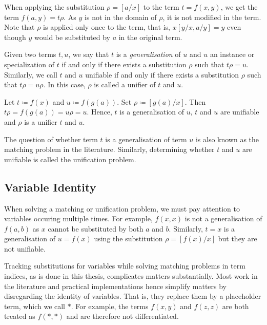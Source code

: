 When applying the substitution $\rho = [a/x]$ to the term $t = f(x,y)$, we get the term $f(a,y) = t \rho$. As $y$ is not in the domain of $\rho$, it is not modified in the term. Note that $\rho$ is applied only once to the term, that is, $x [y/x, a/y] = y$ even though $y$ would be substituted by $a$ in the original term.

\begin{defn}
Given two terms $t, u$, we say that $t$ is a \emph{generalisation} of $u$ and $u$ an instance or specialization of $t$ if and only if there exists a substitution $\rho$ such that $t \rho = u$. Similarly, we call $t$ and $u$ unifiable if and only if there exists a substitution $\rho$ such that $t \rho = u \rho$. In this case, $\rho$ is called a unifier of $t$ and $u$.
\end{defn}

\begin{exmpl}
  Let $t \coloneqq f(x)$ and $u \coloneqq f(g(a))$. Set $\rho \coloneqq [g(a)/x]$. Then $t \rho = f(g(a)) = u \rho = u$. Hence, $t$ is a generalisation of $u$, $t$ and $u$ are unifiable and $\rho$ is a unifier $t$ and $u$.
\end{exmpl}

The question of whether term $t$ is a generalisation of term $u$ is also known as the matching problem in the literature. Similarly, determining whether $t$ and $u$ are unifiable is called the unification problem. \cite{mccune_experiments_1992}

\subsection{Variable Identity}\label{var_id}
When solving a matching or unification problem, we must pay attention to variables occuring multiple times. For example, $f(x,x)$ is not a generalisation of $f(a,b)$ as $x$ cannot be substituted by both $a$ and $b$. Similarly, $t = x$ is a generalisation of $u = f(x)$ using the substitution $\rho = [f(x)/x]$ but they are not unifiable.

Tracking substitutions for variables while solving matching problems in term indices, as is done in this thesis, complicates matters substantially.
Most work in the literature and practical implementations hence simplify matters by disregarding the identity of variables. That is, they replace them by a placeholder term, which we call $*$. For example, the terms $f(x,y)$ and $f(z,z)$ are both treated as $f(*,*)$ and are therefore not differentiated.

